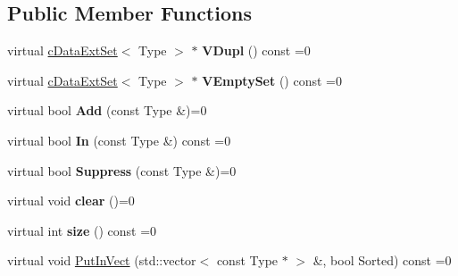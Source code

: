 \subsection*{Public Member Functions}
\begin{DoxyCompactItemize}
\item 
virtual \hyperlink{classMMVII_1_1cDataExtSet}{c\+Data\+Ext\+Set}$<$ Type $>$ $\ast$ {\bfseries V\+Dupl} () const =0\hypertarget{classMMVII_1_1cDataExtSet_a396b9e619802cdeab4313122e233a28c}{}\label{classMMVII_1_1cDataExtSet_a396b9e619802cdeab4313122e233a28c}

\item 
virtual \hyperlink{classMMVII_1_1cDataExtSet}{c\+Data\+Ext\+Set}$<$ Type $>$ $\ast$ {\bfseries V\+Empty\+Set} () const =0\hypertarget{classMMVII_1_1cDataExtSet_a42a487345a7c391e712b7019fcb8fdfa}{}\label{classMMVII_1_1cDataExtSet_a42a487345a7c391e712b7019fcb8fdfa}

\item 
virtual bool {\bfseries Add} (const Type \&)=0\hypertarget{classMMVII_1_1cDataExtSet_a5390462016fc5b6d311c35ac311f18be}{}\label{classMMVII_1_1cDataExtSet_a5390462016fc5b6d311c35ac311f18be}

\item 
virtual bool {\bfseries In} (const Type \&) const =0\hypertarget{classMMVII_1_1cDataExtSet_ac507b62c0cb19da4bedd69114cb2fe15}{}\label{classMMVII_1_1cDataExtSet_ac507b62c0cb19da4bedd69114cb2fe15}

\item 
virtual bool {\bfseries Suppress} (const Type \&)=0\hypertarget{classMMVII_1_1cDataExtSet_a0c8df4b5b6c696f81bd3765314a7ec5c}{}\label{classMMVII_1_1cDataExtSet_a0c8df4b5b6c696f81bd3765314a7ec5c}

\item 
virtual void {\bfseries clear} ()=0\hypertarget{classMMVII_1_1cDataExtSet_ad72d5da775e46917600b1f0a166a3756}{}\label{classMMVII_1_1cDataExtSet_ad72d5da775e46917600b1f0a166a3756}

\item 
virtual int {\bfseries size} () const =0\hypertarget{classMMVII_1_1cDataExtSet_a3e60b0a1a9789b4e9fc8dce4c0b9110c}{}\label{classMMVII_1_1cDataExtSet_a3e60b0a1a9789b4e9fc8dce4c0b9110c}

\item 
virtual void \hyperlink{classMMVII_1_1cDataExtSet_abd647c0ee78d571538bf73368594f97a}{Put\+In\+Vect} (std\+::vector$<$ const Type $\ast$ $>$ \&, bool Sorted) const =0\hypertarget{classMMVII_1_1cDataExtSet_abd647c0ee78d571538bf73368594f97a}{}\label{classMMVII_1_1cDataExtSet_abd647c0ee78d571538bf73368594f97a}


\end{DoxyCompactItemize}
